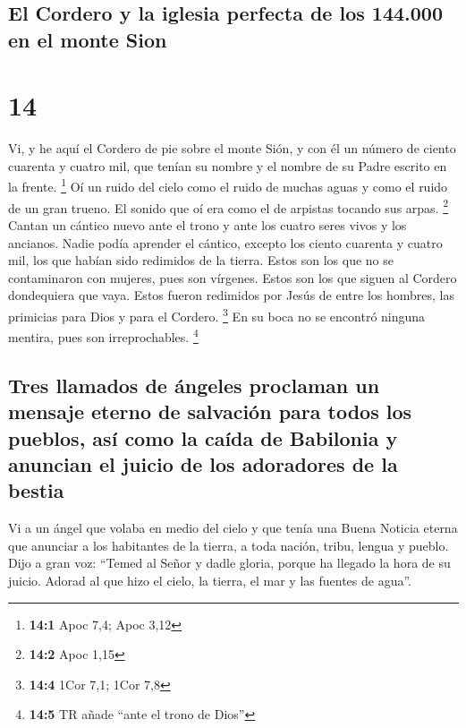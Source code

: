 \hypertarget{el-cordero-y-la-iglesia-perfecta-de-los-144.000-en-el-monte-sion}{%
\subsection{El Cordero y la iglesia perfecta de los 144.000 en el monte
Sion}\label{el-cordero-y-la-iglesia-perfecta-de-los-144.000-en-el-monte-sion}}

\hypertarget{section-13}{%
\section{14}\label{section-13}}

 Vi, y he aquí el Cordero de pie sobre el monte Sión, y
con él un número de ciento cuarenta y cuatro mil, que tenían su nombre y
el nombre de su Padre escrito en la frente. \footnote{\textbf{14:1} Apoc
  7,4; Apoc 3,12}  Oí un ruido del cielo como el ruido de
muchas aguas y como el ruido de un gran trueno. El sonido que oí era
como el de arpistas tocando sus arpas. \footnote{\textbf{14:2} Apoc 1,15}
 Cantan un cántico nuevo ante el trono y ante los cuatro
seres vivos y los ancianos. Nadie podía aprender el cántico, excepto los
ciento cuarenta y cuatro mil, los que habían sido redimidos de la
tierra.  Estos son los que no se contaminaron con mujeres,
pues son vírgenes. Estos son los que siguen al Cordero dondequiera que
vaya. Estos fueron redimidos por Jesús de entre los hombres, las
primicias para Dios y para el Cordero. \footnote{\textbf{14:4} 1Cor 7,1;
  1Cor 7,8}  En su boca no se encontró ninguna mentira,
pues son irreprochables. \footnote{\textbf{14:5} TR añade ``ante el
  trono de Dios''}

\hypertarget{tres-llamados-de-uxe1ngeles-proclaman-un-mensaje-eterno-de-salvaciuxf3n-para-todos-los-pueblos-asuxed-como-la-cauxedda-de-babilonia-y-anuncian-el-juicio-de-los-adoradores-de-la-bestia}{%
\subsection{Tres llamados de ángeles proclaman un mensaje eterno de
salvación para todos los pueblos, así como la caída de Babilonia y
anuncian el juicio de los adoradores de la
bestia}\label{tres-llamados-de-uxe1ngeles-proclaman-un-mensaje-eterno-de-salvaciuxf3n-para-todos-los-pueblos-asuxed-como-la-cauxedda-de-babilonia-y-anuncian-el-juicio-de-los-adoradores-de-la-bestia}}

 Vi a un ángel que volaba en medio del cielo y que tenía
una Buena Noticia eterna que anunciar a los habitantes de la tierra, a
toda nación, tribu, lengua y pueblo.  Dijo a gran voz:
``Temed al Señor y dadle gloria, porque ha llegado la hora de su juicio.
Adorad al que hizo el cielo, la tierra, el mar y las fuentes de agua''.

